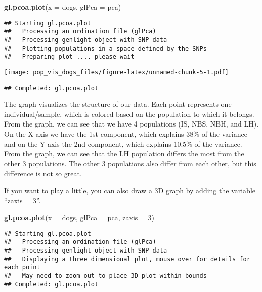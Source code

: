 \documentclass[
]{article}
\newenvironment{Shaded}{\begin{snugshade}}{\end{snugshade}}
\newcommand{\AttributeTok}[1]{\textcolor[rgb]{0.13,0.29,0.53}{#1}}
\newcommand{\DecValTok}[1]{\textcolor[rgb]{0.00,0.00,0.81}{#1}}
\newcommand{\FunctionTok}[1]{\textcolor[rgb]{0.13,0.29,0.53}{\textbf{#1}}}
\newcommand{\NormalTok}[1]{#1}
\begin{document}
\begin{Shaded}
\begin{Highlighting}[]
\FunctionTok{gl.pcoa.plot}\NormalTok{(}\AttributeTok{x =}\NormalTok{ dogs, }\AttributeTok{glPca =}\NormalTok{ pca)}
\end{Highlighting}
\end{Shaded}

\begin{verbatim}
## Starting gl.pcoa.plot 
##   Processing an ordination file (glPca)
##   Processing genlight object with SNP data
##   Plotting populations in a space defined by the SNPs
##   Preparing plot .... please wait
\end{verbatim}

\texttt{[image: pop\_vis\_dogs\_files/figure-latex/unnamed-chunk-5-1.pdf]}

\begin{verbatim}
## Completed: gl.pcoa.plot
\end{verbatim}

The graph visualizes the structure of our data. Each point represents
one individual/sample, which is colored based on the population to which
it belongs. From the graph, we can see that we have 4 populations (IS,
NBS, NBH, and LH). On the X-axis we have the 1st component, which
explains 38\% of the variance and on the Y-axis the 2nd component, which
explains 10.5\% of the variance. From the graph, we can see that the LH
population differs the most from the other 3 populations. The other 3
populations also differ from each other, but this difference is not so
great.

If you want to play a little, you can also draw a 3D graph by adding the
variable ``zaxis = 3''.

\begin{Shaded}
\begin{Highlighting}[]
\FunctionTok{gl.pcoa.plot}\NormalTok{(}\AttributeTok{x =}\NormalTok{ dogs, }\AttributeTok{glPca =}\NormalTok{ pca, }\AttributeTok{zaxis =} \DecValTok{3}\NormalTok{)}
\end{Highlighting}
\end{Shaded}

\begin{verbatim}
## Starting gl.pcoa.plot 
##   Processing an ordination file (glPca)
##   Processing genlight object with SNP data
##   Displaying a three dimensional plot, mouse over for details for each point
##   May need to zoom out to place 3D plot within bounds
## Completed: gl.pcoa.plot
\end{verbatim}
\end{document}
